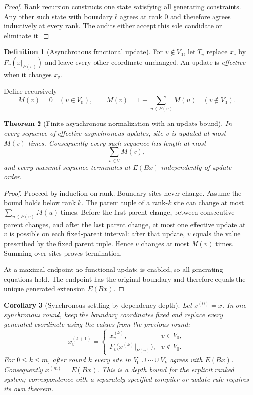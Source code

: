 \documentclass[11pt]{article}
\newtheorem{theorem}{Theorem}[section]
\newtheorem{corollary}[theorem]{Corollary}
\theoremstyle{definition}
\newtheorem{definition}[theorem]{Definition}
\theoremstyle{remark}
\numberwithin{equation}{section}
\begin{document}
\begin{proof}
Rank recursion constructs one state satisfying all generating constraints.  Any other such state with boundary $b$ agrees at rank $0$ and therefore agrees inductively at every rank.  The audits either accept this sole candidate or eliminate it.
\end{proof}

\begin{definition}[Asynchronous functional update]
For $v\notin V_0$, let $T_v$ replace $x_v$ by $F_v(x|_{P(v)})$ and leave every other coordinate unchanged.  An update is \emph{effective} when it changes $x_v$.
\end{definition}

Define recursively
\[
 M(v)=0\quad(v\in V_0),
 \qquad
 M(v)=1+\sum_{u\in P(v)}M(u)\quad(v\notin V_0).
\]

\begin{theorem}[Finite asynchronous normalization with an update bound]\label{thm:functional-termination}
In every sequence of effective asynchronous updates, site $v$ is updated at most $M(v)$ times.  Consequently every such sequence has length at most
\[
 \sum_{v\in V}M(v),
\]
and every maximal sequence terminates at $E(Bx)$ independently of update order.
\end{theorem}

\begin{proof}
Proceed by induction on rank.  Boundary sites never change.  Assume the bound
holds below rank $k$.  The parent tuple of a rank-$k$ site can change at most
$\sum_{u\in P(v)}M(u)$ times.  Before the first parent change, between
consecutive parent changes, and after the last parent change, at most one
effective update at $v$ is possible on each fixed-parent interval: after that
update, $v$ equals the value prescribed by the fixed parent tuple.  Hence $v$
changes at most $M(v)$ times.  Summing over sites proves termination.

At a maximal endpoint no functional update is enabled, so all generating equations hold.  The endpoint has the original boundary and therefore equals the unique generated extension $E(Bx)$.
\end{proof}

\begin{corollary}[Synchronous settling by dependency depth]\label{cor:functional-synchronous}
Let $x^{(0)}=x$.  In one synchronous round, keep the boundary coordinates
fixed and replace every generated coordinate using the values from the
previous round:
\[
 x_v^{(k+1)}
 =
 \begin{cases}
 x_v^{(k)},&v\in V_0,\\
 F_v\bigl(x^{(k)}|_{P(v)}\bigr),&v\notin V_0.
 \end{cases}
\]
For $0\le k\le m$, after round $k$ every site in
$V_0\cup\cdots\cup V_k$ agrees with
$E(Bx)$.  Consequently $x^{(m)}=E(Bx)$.  This is a depth bound for the
explicit ranked system; correspondence with a separately specified compiler
or update rule requires its own theorem.
\end{corollary}
\end{document}
